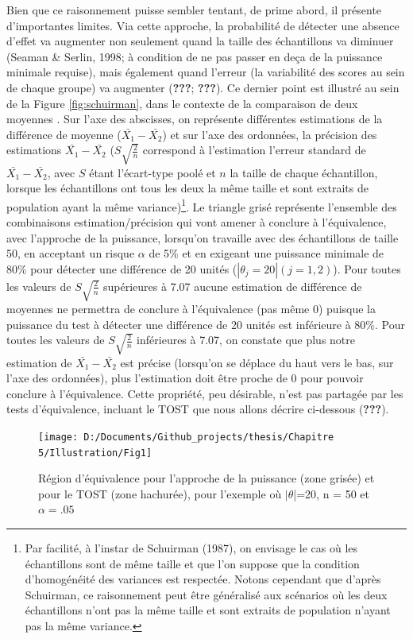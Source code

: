 \documentclass[
  english,
  man]{apa6}
\begin{document}
Bien que ce raisonnement puisse sembler tentant, de prime abord, il présente d'importantes limites. Via cette approche, la probabilité de détecter une absence d'effet va augmenter non seulement quand la taille des échantillons va diminuer (Seaman \& Serlin, 1998; à condition de ne pas passer en deça de la puissance minimale requise), mais également quand l'erreur (la variabilité des scores au sein de chaque groupe) va augmenter ({\textbf{???}}; {\textbf{???}}). Ce dernier point est illustré au sein de la Figure \ref{fig:schuirman}, dans le contexte de la comparaison de deux moyennes . Sur l'axe des abscisses, on représente différentes estimations de la différence de moyenne (\(\bar{X_1}-\bar{X_2}\)) et sur l'axe des ordonnées, la précision des estimations \(\bar{X_1}-\bar{X_2}\) (\(S\sqrt{\frac{2}{n}}\) correspond à l'estimation l'erreur standard de \(\bar{X_1}-\bar{X_2}\), avec \(S\) étant l'écart-type poolé et \(n\) la taille de chaque échantillon, lorsque les échantillons ont tous les deux la même taille et sont extraits de population ayant la même variance)\footnote{Par facilité, à l'instar de Schuirman (1987), on envisage le cas où les échantillons sont de même taille et que l'on suppose que la condition d'homogénéité des variances est respectée. Notons cependant que d'après Schuirman, ce raisonnement peut être généralisé aux scénarios où les deux échantillons n'ont pas la même taille et sont extraits de population n'ayant pas la même variance.}. Le triangle grisé représente l'ensemble des combinaisons estimation/précision qui vont amener à conclure à l'équivalence, avec l'approche de la puissance, lorsqu'on travaille avec des échantillons de taille 50, en acceptant un risque \(\alpha\) de 5\% et en exigeant une puissance minimale de 80\% pour détecter une différence de 20 unités (\(|\theta_j=20| (j=1,2)\)). Pour toutes les valeurs de \(S\sqrt{\frac{2}{n}}\) supérieures à 7.07 aucune estimation de différence de moyennes ne permettra de conclure à l'équivalence (pas même 0) puisque la puissance du test à détecter une différence de 20 unités est inférieure à 80\%. Pour toutes les valeurs de \(S\sqrt{\frac{2}{n}}\) inférieures à 7.07, on constate que plus notre estimation de \(\bar{X_1}-\bar{X_2}\) est précise (lorsqu'on se déplace du haut vers le bas, sur l'axe des ordonnées), plus l'estimation doit être proche de 0 pour pouvoir conclure à l'équivalence. Cette propriété, peu désirable, n'est pas partagée par les tests d'équivalence, incluant le TOST que nous allons décrire ci-dessous ({\textbf{???}}).

\begin{figure}

{\centering \texttt{[image: D:/Documents/Github\_projects/thesis/Chapitre 5/Illustration/Fig1]} 

}

\caption{Région d'équivalence pour l'approche de la puissance (zone grisée) et pour le TOST (zone hachurée), pour l'exemple où $|\theta$|=20, n = 50 et $\alpha=.05$}\label{fig:schuirman2}
\end{figure}
\end{document}
